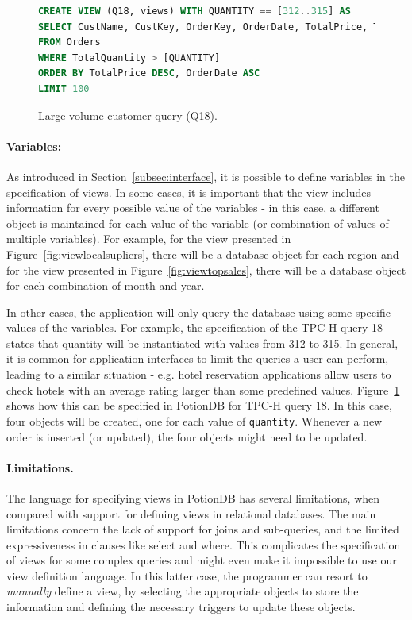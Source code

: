 \documentclass[sigplan,twocolumn,review,anonymous]{acmart}
\begin{document}
\begin{figure}[h]
	\begin{lstlisting}[language=SQL]
CREATE VIEW (Q18, views) WITH QUANTITY == [312..315] AS
SELECT CustName, CustKey, OrderKey, OrderDate, TotalPrice, TotalQuantity
FROM Orders
WHERE TotalQuantity > [QUANTITY]
ORDER BY TotalPrice DESC, OrderDate ASC
LIMIT 100
	\end{lstlisting}
	\vspace{-5pt}
	\caption{Large volume customer query (Q18).}
	\vspace{-5pt}
	\label{fig:q18_view}
\end{figure}


\paragraph{Variables:} As introduced in Section~\ref{subsec:interface}, it is possible to define 
variables in the specification of views. In some cases, it is important that the view includes information 
for every possible value of the variables - in this case, a different object is maintained for each
value of the variable (or combination of values of multiple variables). 
For example, for the view presented in Figure~\ref{fig:viewlocalsupliers}, there
will be a database object for each region and for the view presented in Figure~\ref{fig:viewtopsales}, there 
will be a database object for each combination of month and year.

In other cases, the application will only query the database using some specific values of the
variables. For example,  the specification of the TPC-H query 18 states that quantity will be instantiated with values
from 312 to 315. In general, it is common for application interfaces to limit the queries a user can perform, 
leading to a similar situation - e.g. hotel reservation applications allow users to check hotels with an average 
rating larger than some predefined values.
Figure~\ref{fig:q18_view} shows how this can be specified in PotionDB for TPC-H query 18. 
In this case, four objects will be created, one for each value of \texttt{quantity}. Whenever a new
order is inserted (or updated), the four objects might need to be updated.

\paragraph{Limitations.} The language for specifying views in PotionDB has several limitations, when
compared with support for defining views in relational databases. The main limitations concern the 
lack of support for joins and sub-queries, and the limited expressiveness in clauses like select and where. 
This complicates the specification of views for some complex queries and might even make it 
impossible to use our view definition language.  In this latter case, the programmer can resort to \emph{manually}
define a view, by selecting the appropriate objects to store the information and defining the necessary triggers
to update these objects.
\end{document}
